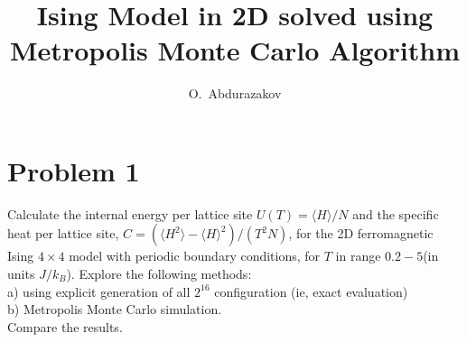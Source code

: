 \documentclass[a4paper,prb,8pt]{revtex4-1}
\begin{document}
\title{Ising Model in 2D solved using Metropolis Monte Carlo Algorithm}
\author{O.~Abdurazakov}
\maketitle
\section*{Problem 1}

Calculate the internal energy per lattice site $U(T) = \langle H \rangle/N$ and the specific heat per lattice site, $C = (\langle H^2\rangle - \langle H \rangle^2) /(T^2N)$, for the 2D ferromagnetic Ising $4\times4$ model with periodic boundary conditions, for $T$ in range $0.2-5$(in units $J/k_B$). Explore the following methods:\\
a) using explicit generation of all $2^{16}$ configuration (ie, exact evaluation)\\
b) Metropolis Monte Carlo simulation.\\
Compare the results. 
\end{document}
